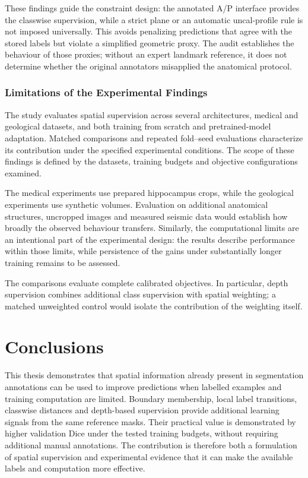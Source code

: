 \documentclass[12pt,a4paper]{article}
\begin{document}
These findings guide the constraint design: the annotated A/P interface
provides the classwise supervision, while a strict plane or an automatic
uncal-profile rule is not imposed universally. This avoids penalizing
predictions that agree with the stored labels but violate a simplified
geometric proxy. The audit establishes the behaviour of those proxies;
without an expert landmark reference, it does not determine whether
the original annotators misapplied the anatomical protocol.

\subsubsection{Limitations of the Experimental Findings}
\label{sec:experimental-limitations}

The study evaluates spatial supervision across several architectures,
medical and geological datasets, and both training from scratch and
pretrained-model adaptation. Matched comparisons and repeated fold--seed
evaluations characterize its contribution under the specified experimental
conditions. The scope of these findings is defined by the datasets,
training budgets and objective configurations examined.

The medical experiments use prepared hippocampus crops, while the
geological experiments use synthetic volumes. Evaluation on additional
anatomical structures, uncropped images and measured seismic data would
establish how broadly the observed behaviour transfers. Similarly, the
computational limits are an intentional part of the experimental design:
the results describe performance within those limits, while persistence
of the gains under substantially longer training remains to be assessed.

The comparisons evaluate complete calibrated objectives. In particular,
depth supervision combines additional class supervision with spatial
weighting; a matched unweighted control would isolate the contribution
of the weighting itself.



\clearpage

\section{Conclusions}\label{sec:conclusions}

This thesis demonstrates that spatial information already present in
segmentation annotations can be used to improve predictions when labelled
examples and training computation are limited. Boundary membership,
local label transitions, classwise distances and depth-based supervision
provide additional learning signals from the same reference masks.
Their practical value is demonstrated by higher validation Dice under
the tested training budgets, without requiring additional manual
annotations. The contribution is therefore both a formulation of spatial
supervision and experimental evidence that it can make the available
labels and computation more effective.
\end{document}
